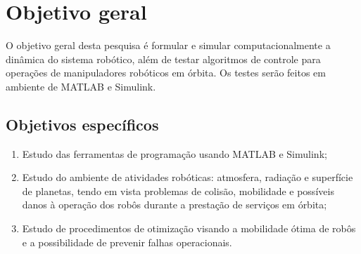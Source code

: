 \section{Objetivo geral}

O objetivo geral desta pesquisa é formular e simular computacionalmente a dinâmica do sistema robótico, além de testar algoritmos de controle para operações de manipuladores robóticos em órbita.
Os testes serão feitos em ambiente de MATLAB e Simulink.

\subsection{Objetivos específicos}

\begin{enumerate}[label=(\roman*)]
    \item Estudo das ferramentas de programação usando MATLAB e Simulink;

    \item Estudo do ambiente de atividades robóticas: atmosfera, radiação e superfície de planetas, tendo em vista problemas de colisão, mobilidade e possíveis danos à operação dos robôs durante a prestação de serviços em órbita;

    \item Estudo de procedimentos de otimização visando a mobilidade ótima de robôs e a possibilidade de prevenir falhas operacionais.
\end{enumerate}
